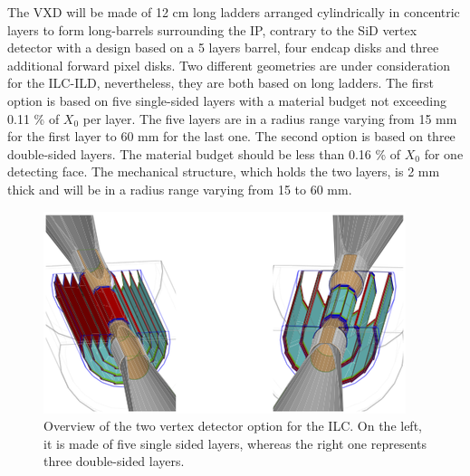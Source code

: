    The \gls{VXD} will be made of 12 cm long ladders arranged cylindrically in concentric layers to form long-barrels surrounding the \gls{IP}, contrary to the \gls{SiD} vertex detector with a design based on a 5 layers barrel, four endcap disks and three additional forward pixel disks\cite{Behnke2010}.
   Two different geometries are under consideration for the \gls{ILC}-{ILD}, nevertheless, they are both based on long ladders. 
   The first option is based on five single-sided layers with a material budget not exceeding 0.11 \% of $X_0$ per layer.
   The five layers are in a radius range varying from 15 mm for the first layer to 60 mm for the last one.
   The second option is based on three double-sided layers.
   The material budget should be less than 0.16 \% of $X_0$ for one detecting face.
   The mechanical structure, which holds the two layers, is 2 mm thick and will be in a radius range varying from 15 to 60 mm.

   
   
   \begin{figure}[!h]
     \centering
     \includegraphics[width = 10 cm]{Pictures/vxd/ild_VXD.png}
     \caption{Overview of the two vertex detector option for the ILC. On the left, it is made of five single sided layers, whereas the right one represents three double-sided layers.}
   \end{figure}
   
